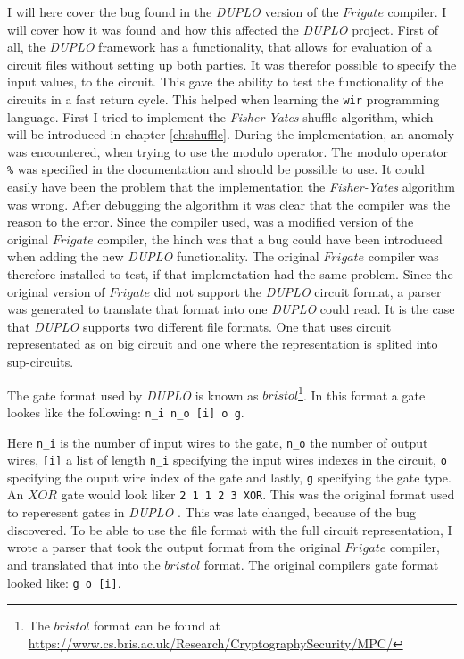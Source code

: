 \documentclass[twoside,11pt,openright]{report}
\newcommand{\FY}{\textit{Fisher-Yates} }
\newcommand{\DUPLO}{\textit{DUPLO} }
\begin{document}
I will here cover the bug found in the \DUPLO version of the $Frigate$ compiler. I will cover how it was found and how this affected the \DUPLO project. First of all, the \DUPLO framework has a functionality, that allows for evaluation of a circuit files without setting up both parties. It was therefor possible to specify the input values, to the circuit. This gave the ability to test the functionality of the circuits in a fast return cycle. This helped when learning the \verb|wir| programming language. First I tried to implement the \FY shuffle algorithm, which will be introduced in chapter \ref{ch:shuffle}. During the implementation, an anomaly was encountered, when trying to use the modulo operator. The modulo operator \verb|%| was specified in the documentation and should be possible to use. It could easily have been the problem that the implementation the \FY algorithm was wrong. After debugging the algorithm it was clear that the compiler was the reason to the error. Since the compiler used, was a modified version of the original $Frigate$ compiler, the hinch was that a bug could have been introduced when adding the new \DUPLO functionality. The original $Frigate$ compiler was therefore installed to test, if that implemetation had the same problem. Since the original version of $Frigate$ did not support the \DUPLO circuit format, a parser was generated to translate that format into one \DUPLO could read. It is the case that \DUPLO supports two different file formats. One that uses circuit representated as on big circuit and one where the representation is splited into sup-circuits.

The gate format used by \DUPLO is known as $bristol$\footnote{The $bristol$ format can be found at \newline\url{https://www.cs.bris.ac.uk/Research/CryptographySecurity/MPC/}}. In this format a gate lookes like the following: \verb|n_i n_o [i] o g|.

Here \verb|n_i| is the number of input wires to the gate, \verb|n_o| the number of output wires, \verb|[i]| a list of length \verb|n_i| specifying the input wires indexes in the circuit, \verb|o| specifying the ouput wire index of the gate and lastly, \verb|g| specifying the gate type. An $XOR$ gate would look liker \verb|2 1 1 2 3 XOR|. This was the original format used to reperesent gates in \DUPLO. This was late changed, because of the bug discovered. To be able to use the file format with the full circuit representation, I wrote a parser that took the output format from the original $Frigate$ compiler, and translated that into the $bristol$ format. The original compilers gate format looked like: \verb|g o [i]|.
\end{document}
